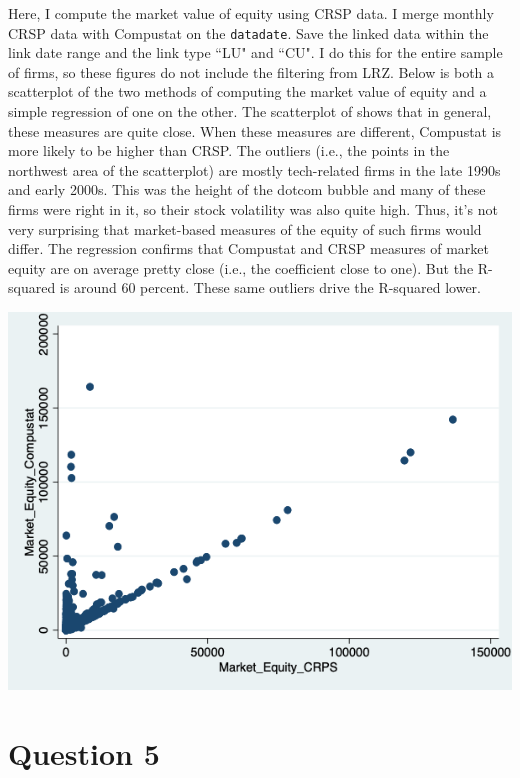 \documentclass{article}
\begin{document}
Here, I compute the market value of equity using CRSP data.  I merge monthly CRSP data with Compustat on the \texttt{datadate}. Save the linked data within the link date range and the link type ``LU" and ``CU".  I do this for the entire sample of firms, so these figures do not include the filtering from LRZ. Below is both a scatterplot of the two methods of computing the market value of equity and a simple regression of one on the other.  The scatterplot of shows that in general, these measures are quite close.  When these measures are different, Compustat is more likely to be higher than CRSP.  The outliers (i.e., the points in the northwest area of the scatterplot) are mostly tech-related firms in the late 1990s and early 2000s.  This was the height of the dotcom bubble and many of these firms were right in it, so their stock volatility was also quite high.  Thus, it's not very surprising that market-based measures of the equity of such firms would differ.  The regression confirms that Compustat and CRSP measures of market equity are on average pretty close (i.e., the coefficient close to one).  But the R-squared is around 60 percent.  These same outliers drive the R-squared lower.

\bigskip

\includegraphics[scale=0.5]{m_equity_scatter}

\bigskip



\pagebreak

\section{Question 5}
\end{document}
